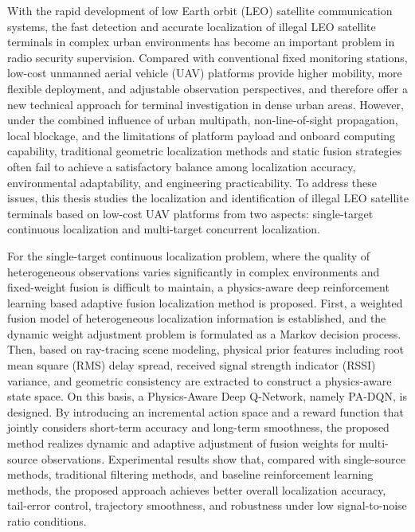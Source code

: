 \begin{enabstract}
With the rapid development of low Earth orbit (LEO) satellite communication systems, the fast detection and accurate localization of illegal LEO satellite terminals in complex urban environments has become an important problem in radio security supervision. Compared with conventional fixed monitoring stations, low-cost unmanned aerial vehicle (UAV) platforms provide higher mobility, more flexible deployment, and adjustable observation perspectives, and therefore offer a new technical approach for terminal investigation in dense urban areas. However, under the combined influence of urban multipath, non-line-of-sight propagation, local blockage, and the limitations of platform payload and onboard computing capability, traditional geometric localization methods and static fusion strategies often fail to achieve a satisfactory balance among localization accuracy, environmental adaptability, and engineering practicability. To address these issues, this thesis studies the localization and identification of illegal LEO satellite terminals based on low-cost UAV platforms from two aspects: single-target continuous localization and multi-target concurrent localization.

For the single-target continuous localization problem, where the quality of heterogeneous observations varies significantly in complex environments and fixed-weight fusion is difficult to maintain, a physics-aware deep reinforcement learning based adaptive fusion localization method is proposed. First, a weighted fusion model of heterogeneous localization information is established, and the dynamic weight adjustment problem is formulated as a Markov decision process. Then, based on ray-tracing scene modeling, physical prior features including root mean square (RMS) delay spread, received signal strength indicator (RSSI) variance, and geometric consistency are extracted to construct a physics-aware state space. On this basis, a Physics-Aware Deep Q-Network, namely PA-DQN, is designed. By introducing an incremental action space and a reward function that jointly considers short-term accuracy and long-term smoothness, the proposed method realizes dynamic and adaptive adjustment of fusion weights for multi-source observations. Experimental results show that, compared with single-source methods, traditional filtering methods, and baseline reinforcement learning methods, the proposed approach achieves better overall localization accuracy, tail-error control, trajectory smoothness, and robustness under low signal-to-noise ratio conditions.


\end{enabstract}
